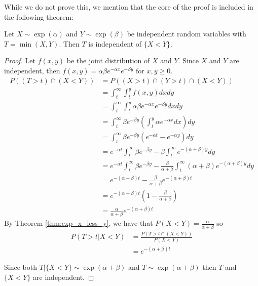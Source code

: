 While we do not prove this, we mention that the core of the proof is included in the following theorem:

\begin{theorem}
Let $X \sim \exp(\alpha)$ and $Y \sim \exp(\beta)$ be independent random variables with $T = \min(X,Y)$.
Then $T$ is independent of $\{X < Y\}$.
\end{theorem}

\begin{proof}
Let $f(x,y)$ be the joint distribution of $X$ and $Y$.
Since $X$ and $Y$ are independent, then $f(x,y) = \alpha \beta e^{-\alpha x} e^{-\beta y}$ for $x,y \geq 0$.
\begin{align*}
    P((T > t) \cap (X < Y)) &= P((X > t) \cap (Y > t) \cap (X < Y))\\
    &= \int_t^\infty \int_t^y f(x,y) dx dy\\
    &= \int_t^\infty \int_t^y \alpha \beta e^{-\alpha x} e^{-\beta y} dx dy\\
    &= \int_t^\infty \beta e^{-\beta y} \left(\int_t^y \alpha e^{-\alpha x} dx \right)  dy\\
    &= \int_t^\infty \beta e^{-\beta y} \left( e^{-\alpha t} - e^{-\alpha y} \right) dy\\
    &= e^{-\alpha t} \int_t^\infty \beta e^{-\beta y} - \beta \int_t^\infty e^{-(\alpha + \beta) y} dy\\
    &= e^{-\alpha t} \int_t^\infty \beta e^{-\beta y} - \frac{\beta}{\alpha + \beta} \int_t^\infty (\alpha + \beta) e^{-(\alpha + \beta) y} dy\\
    &= e^{-(\alpha + \beta) t} - \frac{\beta}{\alpha + \beta} e^{-(\alpha + \beta) t}\\
    &= e^{-(\alpha + \beta) t} \left(1 - \frac{\beta}{\alpha + \beta} \right)\\
    &= \frac{\alpha}{\alpha + \beta} e^{-(\alpha + \beta) t}
\end{align*}
By Theorem \ref{thm:exp_x_less_y}, we have that $P(X < Y) = \frac{\alpha}{\alpha + \beta}$ so
\begin{align*}
    P(T > t | X < Y) &= \frac{P(T > t \cap (X < Y))}{P(X < Y)}\\
    &= e^{-(\alpha + \beta) t}
\end{align*}

Since both $T | \{X < Y\} \sim \exp(\alpha + \beta)$ and $T \sim \exp(\alpha + \beta)$ then $T$ and $\{X < Y\}$ are independent.
\end{proof}

